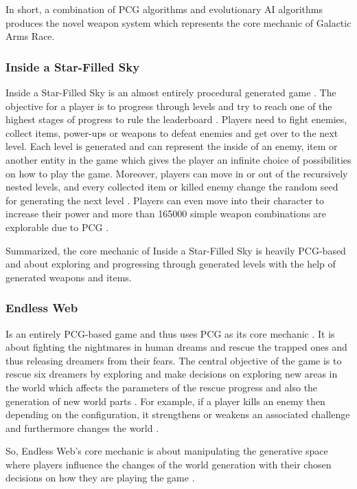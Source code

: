 \documentclass[MGS,Master,english]{twbook}%
\begin{document}
In short, a combination of \ac{PCG} algorithms and evolutionary \ac{AI} algorithms produces the novel weapon system which represents the core mechanic of Galactic Arms Race.

\subsubsection{Inside a Star-Filled Sky}
Inside a Star-Filled Sky is an almost entirely procedural generated game \cite{game::insideAStarFilledSky}. The objective for a player is to progress through levels and try to reach one of the highest stages of progress to rule the leaderboard \cite{game::insideAStarFilledSky}. Players need to fight enemies, collect items, power-ups or weapons to defeat enemies and get over to the next level. Each level is generated and can represent the inside of an enemy, item or another entity in the game which gives the player an infinite choice of possibilities on how to play the game. Moreover, players can move in or out of the recursively nested levels, and every collected item or killed enemy change the random seed for generating the next level \cite{pcg::endlessWeb}. Players can even move into their character to increase their power and more than 165000 simple weapon combinations are explorable due to \ac{PCG} \cite{game::insideAStarFilledSky}.

Summarized, the core mechanic of Inside a Star-Filled Sky is heavily \ac{PCG}-based and about exploring and progressing through generated levels with the help of generated weapons and items.

\subsubsection{Endless Web}
Is an entirely \ac{PCG}-based game and thus uses \ac{PCG} as its core mechanic \cite{pcg::endlessWeb}. It is about fighting the nightmares in human dreams and rescue the trapped ones and thus releasing dreamers from their fears. The central objective of the game is to rescue six dreamers by exploring and make decisions on exploring new areas in the world which affects the parameters of the rescue progress and also the generation of new world parts \cite{pcg::endlessWeb}. For example, if a player kills an enemy then depending on the configuration, it strengthens or weakens an associated challenge and furthermore changes the world \cite{pcg::endlessWeb}.

So, Endless Web's core mechanic is about manipulating the generative space where players influence the changes of the world generation with their chosen decisions on how they are playing the game \cite{pcg::endlessWeb}.
\end{document}
